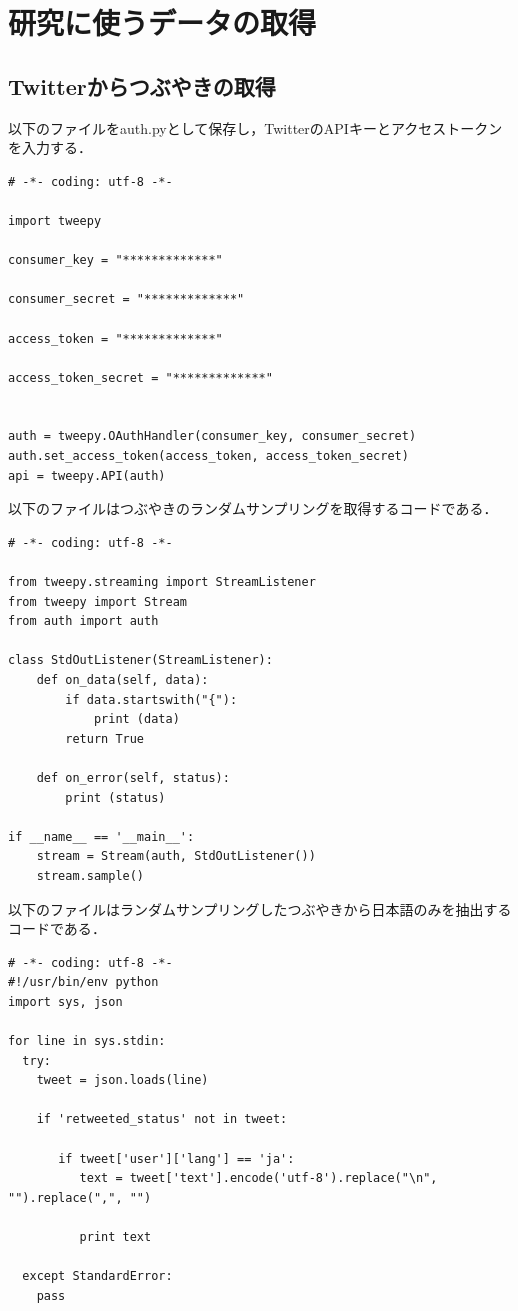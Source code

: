 \section{研究に使うデータの取得}
\subsection{Twitterからつぶやきの取得}
以下のファイルをauth.pyとして保存し，TwitterのAPIキーとアクセストークンを入力する．
\begin{lstlisting}[breaklines = true, basicstyle=\ttfamily\footnotesize, frame=single]
# -*- coding: utf-8 -*-

import tweepy

consumer_key = "*************"

consumer_secret = "*************"

access_token = "*************"

access_token_secret = "*************"


auth = tweepy.OAuthHandler(consumer_key, consumer_secret)
auth.set_access_token(access_token, access_token_secret)
api = tweepy.API(auth)
\end{lstlisting}
\newpage
以下のファイルはつぶやきのランダムサンプリングを取得するコードである\cite{Twitter}．

\begin{lstlisting}[breaklines = true, basicstyle=\ttfamily\footnotesize, frame=single]
# -*- coding: utf-8 -*-
 
from tweepy.streaming import StreamListener
from tweepy import Stream
from auth import auth
 
class StdOutListener(StreamListener):
    def on_data(self, data):
        if data.startswith("{"):
            print (data)
        return True
 
    def on_error(self, status):
        print (status)
 
if __name__ == '__main__':
    stream = Stream(auth, StdOutListener())
    stream.sample()

\end{lstlisting}
\newpage
以下のファイルはランダムサンプリングしたつぶやきから日本語のみを抽出するコードである\cite{Twitter1}．
\begin{lstlisting}[breaklines = true, basicstyle=\ttfamily\footnotesize, frame=single]
# -*- coding: utf-8 -*-
#!/usr/bin/env python
import sys, json

for line in sys.stdin:
  try:
    tweet = json.loads(line)
    
    if 'retweeted_status' not in tweet:
      
       if tweet['user']['lang'] == 'ja':       
          text = tweet['text'].encode('utf-8').replace("\n", "").replace(",", "")

          print text
          
  except StandardError:
    pass
\end{lstlisting}
\newpage
